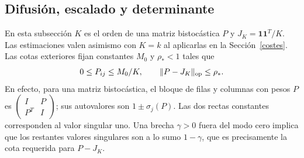 \subsection{Difusión, escalado y determinante}\label{permanente}

En esta subsección $K$ es el orden de una matriz bistocástica $P$ y $J_K=\mathbf1\mathbf1^T/K$. Las
estimaciones valen asimismo con $K=k$ al aplicarlas en la Sección~\ref{costes}. Las cotas
exteriores fijan constantes $M_0$ y $\rho_*<1$ tales que
\begin{equation}\label{terminal-hipotesis-matriz}
 0\le P_{ij}\le M_0/K,\qquad \|P-J_K\|_{\rm op}\le\rho_* .
\end{equation}
En efecto, para una matriz bistocástica, el bloque de filas y columnas con pesos $P$ es
$\left(\begin{smallmatrix}I&P\\P^T&I\end{smallmatrix}\right)$; sus autovalores son $1\pm\sigma_j(P)$.
Las dos rectas constantes corresponden al valor singular uno. Una brecha $\gamma>0$ fuera del modo
cero implica que los restantes valores singulares son a lo sumo $1-\gamma$, que es precisamente la
cota requerida para $P-J_K$.

